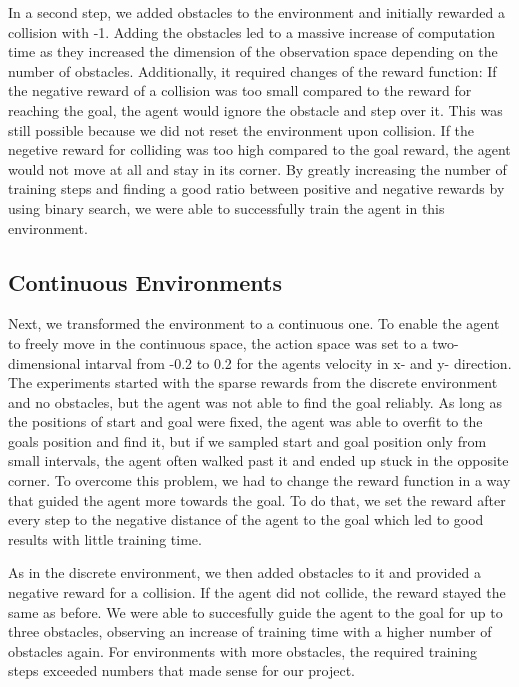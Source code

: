 \documentclass[conference]{IEEEtran}
\begin{document}
In a second step, we added obstacles to the environment and initially rewarded a collision with -1. Adding the obstacles led to a massive increase of computation time as they increased the dimension of the observation space depending on the number of obstacles. Additionally, it required changes of the reward function: If the negative reward of a collision was too small compared to the reward for reaching the goal, the agent would ignore the obstacle and step over it. This was still possible because we did not reset the environment upon collision. If the negetive reward for colliding was too high compared to the goal reward, the agent would not move at all and stay in its corner. By greatly increasing the number of training steps and finding a good ratio between positive and negative rewards by using binary search, we were able to successfully train the agent in this environment.

\subsection{Continuous Environments}

Next, we transformed the environment to a continuous one. To enable the agent to freely move in the continuous space, the action space was set to a two-dimensional intarval from -0.2 to 0.2 for the agents velocity in x- and y- direction. The experiments started with the sparse rewards from the discrete environment and no obstacles, but the agent was not able to find the goal reliably. As long as the positions of start and goal were fixed, the agent was able to overfit to the goals position and find it, but if we sampled start and goal position only from small intervals, the agent often walked past it and ended up stuck in the opposite corner. To overcome this problem, we had to change the reward function in a way that guided the agent more towards the goal. To do that, we set the reward after every step to the negative distance of the agent to the goal which led to good results with little training time.

As in the discrete environment, we then added obstacles to it and provided a negative reward for a collision. If the agent did not collide, the reward stayed the same as before. We were able to succesfully guide the agent to the goal for up to three obstacles, observing an increase of training time with a higher number of obstacles again. For environments with more obstacles, the required training steps exceeded numbers that made sense for our project.
\end{document}
